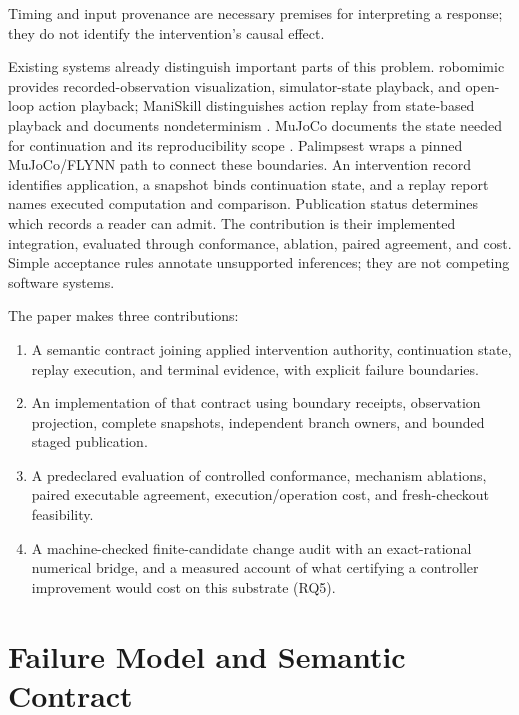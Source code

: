 \documentclass[10pt]{article}
\begin{document}
Timing and input provenance are necessary premises for interpreting a response;
they do not identify the intervention's causal effect.

Existing systems already distinguish important parts of this problem.
robomimic provides recorded-observation visualization, simulator-state playback,
and open-loop action playback; ManiSkill distinguishes action replay from
state-based playback and documents nondeterminism
\citep{robomimicplayback,maniskillreplay}. MuJoCo documents the state needed for
continuation and its reproducibility scope \citep{mujococomputation}.
Palimpsest wraps a pinned MuJoCo/FLYNN path to connect these boundaries. An
intervention record identifies application, a snapshot binds continuation state,
and a replay report names executed computation and comparison. Publication
status determines which records a reader can admit. The contribution is their
implemented integration, evaluated through conformance, ablation, paired
agreement, and cost. Simple acceptance rules annotate unsupported inferences;
they are not competing software systems.

The paper makes three contributions:
\begin{enumerate}
\item A semantic contract joining applied intervention authority, continuation
state, replay execution, and terminal evidence, with explicit failure boundaries.
\item An implementation of that contract using boundary receipts, observation
projection, complete snapshots, independent branch owners, and bounded staged
publication.
\item A predeclared evaluation of controlled conformance, mechanism ablations,
paired executable agreement, execution/operation cost, and fresh-checkout feasibility.
\item A machine-checked finite-candidate change audit with an exact-rational
numerical bridge, and a measured account of what certifying a controller
improvement would cost on this substrate (RQ5).
\end{enumerate}

\section{Failure Model and Semantic Contract}
\label{sec:contract}
\end{document}
